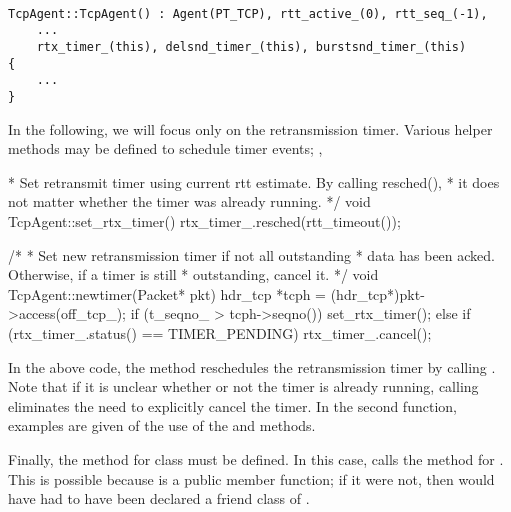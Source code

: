 \begin{small}
\begin{verbatim}

TcpAgent::TcpAgent() : Agent(PT_TCP), rtt_active_(0), rtt_seq_(-1), 
    ...
    rtx_timer_(this), delsnd_timer_(this), burstsnd_timer_(this)
{
    ...
}

\end{verbatim}
\end{small}

In the following, we will focus only on the retransmission timer.  Various
helper methods may be defined to schedule timer events; \eg,

\begin{program}

\*\hspace*{\linewidth}
 * Set retransmit timer using current rtt estimate.  By calling resched(),
 * it does not matter whether the timer was already running.
 */
void TcpAgent::set_rtx_timer()
{
    rtx_timer_.resched(rtt_timeout());
}

/*
 * Set new retransmission timer if not all outstanding
 * data has been acked.  Otherwise, if a timer is still
 * outstanding, cancel it.
 */
void TcpAgent::newtimer(Packet* pkt)
{
    hdr_tcp *tcph = (hdr_tcp*)pkt->access(off_tcp_);
    if (t_seqno_ > tcph->seqno())
        set_rtx_timer();
    else if (rtx_timer_.status() == TIMER_PENDING)
        rtx_timer_.cancel();
}

\end{program}

In the above code, the  method reschedules the 
retransmission timer by calling .  Note that if
it is unclear whether or not the timer is already running, calling
 eliminates the need to explicitly cancel the timer.  In
the second function, examples are given of the use of the 
and  methods.

Finally, the  method for class  must be 
defined.  In this case,  calls the  method
for .  This is possible because  is a 
public member function; if it were not, then  would have
had to have been declared a friend class of .

